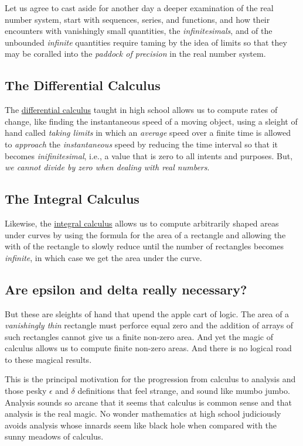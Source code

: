 \documentclass[
  a4paper,
]{article}
\begin{document}
Let us agree to cast aside for another day a deeper examination of the
real number system, start with sequences, series, and functions, and how
their encounters with vanishingly small quantities, the
\emph{infinitesimals}, and of the unbounded \emph{infinite} quantities
require taming by the idea of limits so that they may be coralled into
the \emph{paddock of precision} in the real number system.

\subsection{The Differential Calculus}\label{the-differential-calculus}

The \href{}{differential calculus} taught in high school allows us to
compute rates of change, like finding the instantaneous speed of a
moving object, using a sleight of hand called \emph{taking limits} in
which an \emph{average} speed over a finite time is allowed to
\emph{approach} the \emph{instantaneous} speed by reducing the time
interval so that it becomes \emph{inifinitesimal}, i.e., a value that is
zero to all intents and purposes. But, \emph{we cannot divide by zero
when dealing with real numbers}.

\subsection{The Integral Calculus}\label{the-integral-calculus}

Likewise, the \href{}{integral calculus} allows us to compute
arbitrarily shaped areas under curves by using the formula for the area
of a rectangle and allowing the with of the rectangle to slowly reduce
until the number of rectangles becomes \emph{infinite}, in which case we
get the area under the curve.

\subsection{Are epsilon and delta really
necessary?}\label{are-epsilon-and-delta-really-necessary}

But these are sleights of hand that upend the apple cart of logic. The
area of a \emph{vanishingly thin} rectangle must perforce equal zero and
the addition of arrays of such rectangles cannot give us a finite
non-zero area. And yet the magic of calculus allows us to compute finite
non-zero areas. And there is no logical road to these magical results.

This is the principal motivation for the progression from calculus to
analysis and those pesky \(\epsilon\) and \(\delta\) definitions that
feel strange, and sound like mumbo jumbo. Analysis sounds so arcane that
it seems that calculus is common sense and that analysis is the real
magic. No wonder mathematics at high school judiciously avoids analysis
whose innards seem like black hole when compared with the sunny meadows
of calculus.
\end{document}

